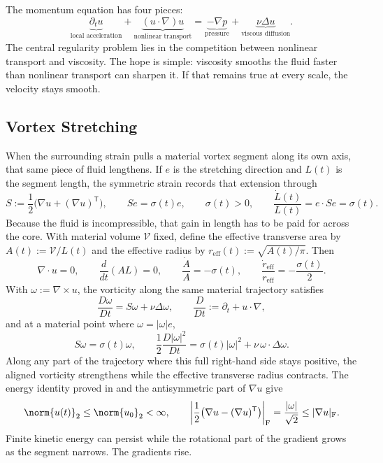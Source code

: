
The momentum equation has four pieces:
\[
  \underbrace{\partial_t u}_{\text{local acceleration}}
  +
  \underbrace{(u\cdot\nabla)u}_{\text{nonlinear transport}}
  =
  \underbrace{-\nabla p}_{\text{pressure}}
  +
  \underbrace{\nu\Delta u}_{\text{viscous diffusion}}.
\]
The central regularity problem lies in the competition between nonlinear transport and viscosity.
The hope is simple: viscosity smooths the fluid faster than nonlinear transport can sharpen it.
If that remains true at every scale, the velocity stays smooth.

\subsection{Vortex Stretching}\label{sub:ThePerfectlyStretchingVortex}

When the surrounding strain pulls a material vortex segment along its own axis, that same piece of fluid lengthens. If \(e\) is the stretching direction and \(L(t)\) is the segment length, the symmetric strain records that extension through
\[
  S:=\frac12\bigl(\nabla u+(\nabla u)^{\mathsf T}\bigr),
  \qquad
  Se=\sigma(t)e,
  \qquad
  \sigma(t)>0,
  \qquad
  \frac{\dot L(t)}{L(t)}
  =
  e\cdot Se
  =
  \sigma(t).
\]
Because the fluid is incompressible, that gain in length has to be paid for across the core. With material volume \(\mathcal V\) fixed, define the effective transverse area by \(A(t):=\mathcal V/L(t)\) and the effective radius by \(r_{\mathrm{eff}}(t):=\sqrt{A(t)/\pi}\). Then
\[
  \nabla\cdot u=0,
  \qquad
  \frac{d}{dt}(A L)=0,
  \qquad
  \frac{\dot A}{A}=-\sigma(t),
  \qquad
  \frac{\dot r_{\mathrm{eff}}}{r_{\mathrm{eff}}}
  =
  -\frac{\sigma(t)}{2}.
\]
With \(\omega:=\nabla\times u\), the vorticity along the same material trajectory satisfies
\[
  \frac{D\omega}{Dt}
  =
  S\omega+\nu\Delta\omega,
  \qquad
  \frac{D}{Dt}
  :=
  \partial_t+u\cdot\nabla,
\]
and at a material point where \(\omega=|\omega|e\),
\[
  S\omega
  =
  \sigma(t)\omega,
  \qquad
  \frac12\frac{D|\omega|^2}{Dt}
  =
  \sigma(t)|\omega|^2
  +
  \nu\,\omega\cdot\Delta\omega.
\]
Along any part of the trajectory where this full right-hand side stays positive, the aligned vorticity strengthens while the effective transverse radius contracts. The energy identity proved in  and the antisymmetric part of \(\nabla u\) give
\[
  \norm{u(t)}_2
  \leq
  \norm{u_0}_2
  <\infty,
  \qquad
  \left|\frac12\bigl(\nabla u-(\nabla u)^{\mathsf T}\bigr)\right|_{\mathrm F}
  =
  \frac{|\omega|}{\sqrt2}
  \leq
  |\nabla u|_{\mathrm F}.
\]
Finite kinetic energy can persist while the rotational part of the gradient grows as the segment narrows. The gradients rise.

